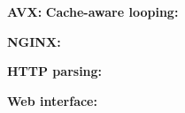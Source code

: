 

\textbf{AVX:}
\textbf{Cache-aware looping:}

\textbf{NGINX:}

\textbf{HTTP parsing:}

\textbf{Web interface:}
